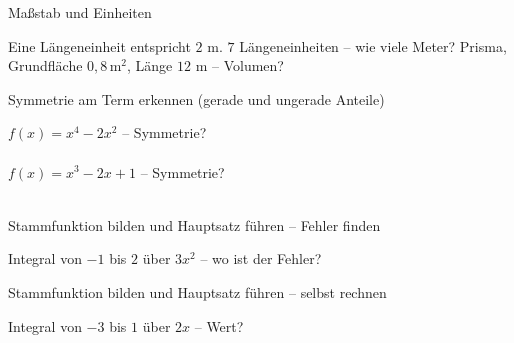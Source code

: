 \begin{aufgabe}{Maßstab und Einheiten}
\begin{teile}
\teil Eine Längeneinheit entspricht $2$ m. $7$ Längeneinheiten – wie viele Meter?
\teil Prisma, Grundfläche $0{,}8\,\text{m}^2$, Länge $12$ m – Volumen?
\end{teile}
\end{aufgabe}

\begin{aufgabe}{Symmetrie am Term erkennen (gerade und ungerade Anteile)}
\begin{teile}
\teil $f(x) = x^4 - 2x^2$ – Symmetrie? \\ \\ 
\teil $f(x) = x^3 - 2x + 1$ – Symmetrie? \\ \\ 
\end{teile}
\end{aufgabe}

\begin{aufgabe}{Stammfunktion bilden und Hauptsatz führen – Fehler finden}
\begin{teile}
\teil Integral von $-1$ bis $2$ über $3x^2$ – wo ist der Fehler? 
\end{teile}
\end{aufgabe}

\begin{aufgabe}{Stammfunktion bilden und Hauptsatz führen – selbst rechnen}
\begin{teile}
\teil Integral von $-3$ bis $1$ über $2x$ – Wert?
\end{teile}
\end{aufgabe}
